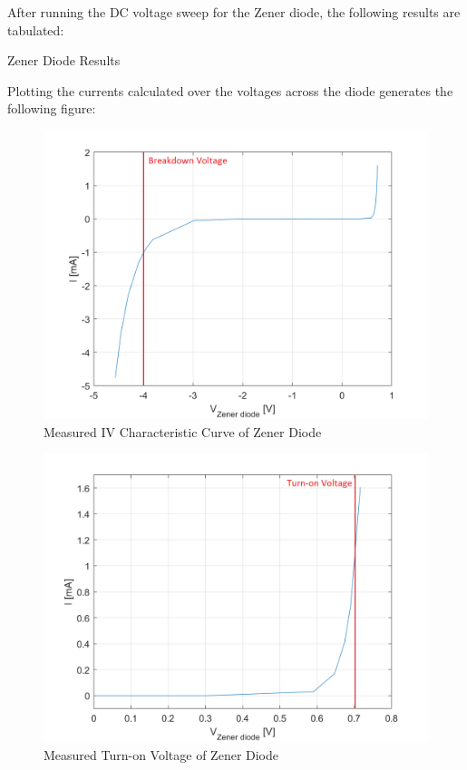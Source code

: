 After running the DC voltage sweep for the Zener diode, the following results are tabulated:

\FloatBarrier

\begin{table}[h!]
	\centering
	\caption{Zener Diode Results}
	\label{tab:zener-results}
\end{table}

\FloatBarrier

Plotting the currents calculated over the voltages across the diode generates the following figure:

\FloatBarrier

\begin{figure}[h!]
	\centering
	\includegraphics[scale=0.4]{../images/zener_diode.PNG}
	\caption{Measured IV Characteristic Curve of Zener Diode}
	\label{fig:zener_measured}
\end{figure}

\begin{figure}[h!]
	\centering
	\includegraphics[scale=0.4]{../images/zener_diode_turn_on.PNG}
	\caption{Measured Turn-on Voltage of Zener Diode}
	\label{fig:zener_turn_on}
\end{figure}

